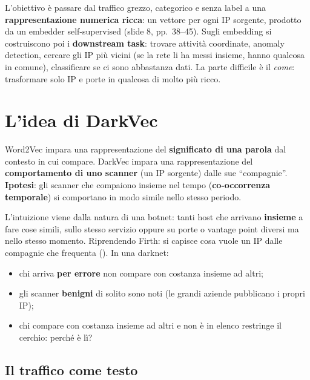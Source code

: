 L'obiettivo è passare dal traffico grezzo, categorico e senza label a una \textbf{rappresentazione numerica ricca}: un vettore per ogni
IP sorgente, prodotto da un embedder self-supervised (slide 8, pp.~38--45). Sugli embedding si costruiscono poi i \textbf{downstream
task}: trovare attività coordinate, anomaly detection, cercare gli IP più vicini (se la rete li ha messi insieme, hanno qualcosa in
comune), classificare se ci sono abbastanza dati. La parte difficile è il \emph{come}: trasformare solo IP e porte in qualcosa di molto
più ricco.

\section{L'idea di DarkVec}
\begin{definizione}
Word2Vec impara una rappresentazione del \textbf{significato di una parola} dal contesto in cui compare. DarkVec impara una
rappresentazione del \textbf{comportamento di uno scanner} (un IP sorgente) dalle sue ``compagnie''.
\textbf{Ipotesi}: gli scanner che compaiono insieme nel tempo (\textbf{co-occorrenza temporale}) si comportano in modo simile nello
stesso periodo.
\end{definizione}
L'intuizione viene dalla natura di una botnet: tanti host che arrivano \textbf{insieme} a fare cose simili, sullo stesso servizio
oppure su porte o vantage point diversi ma nello stesso momento. Riprendendo Firth: si capisce cosa vuole un IP dalle compagnie che
frequenta (). In una darknet:
\begin{itemize}
  \item chi arriva \textbf{per errore} non compare con costanza insieme ad altri;
  \item gli scanner \textbf{benigni} di solito sono noti (le grandi aziende pubblicano i propri IP);
  \item chi compare con costanza insieme ad altri e non è in elenco restringe il cerchio: perché è lì?
\end{itemize}

\subsection{Il traffico come testo}

